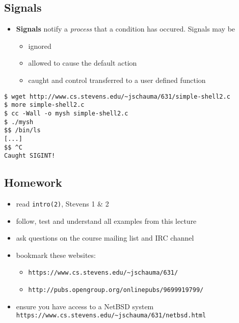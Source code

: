 \documentclass[sxga]{xdvislides}
\begin{document}
\subsection{Signals}
\begin{itemize}
	\item	{\bf Signals} notify a {\em process} that a condition
			has occured. Signals may be
		\begin{itemize}
			\item ignored
			\item allowed to cause the default action
			\item caught and control transferred to a user defined function
		\end{itemize}
\end{itemize}
\vspace*{\fill}
\begin{center}
\begin{verbatim}
$ wget http://www.cs.stevens.edu/~jschauma/631/simple-shell2.c
$ more simple-shell2.c
$ cc -Wall -o mysh simple-shell2.c
$ ./mysh
$$ /bin/ls
[...]
$$ ^C
Caught SIGINT!
\end{verbatim}
\end{center}
\vspace*{\fill}

\subsection{Homework}
\begin{itemize}
	\item read {\tt intro(2)}, Stevens 1 \& 2
	\item follow, test and understand all examples from this lecture
	\item ask questions on the course mailing list and IRC channel
	\item bookmark these websites:
		\begin{itemize}
			\item {\tt https://www.cs.stevens.edu/\~{}jschauma/631/}
			\item {\tt http://pubs.opengroup.org/onlinepubs/9699919799/}
		\end{itemize}
	\item ensure you have access to a NetBSD system
		{\tt https://www.cs.stevens.edu/\~{}jschauma/631/netbsd.html}
	\vspace{.5in}
\end{itemize}
\end{document}
